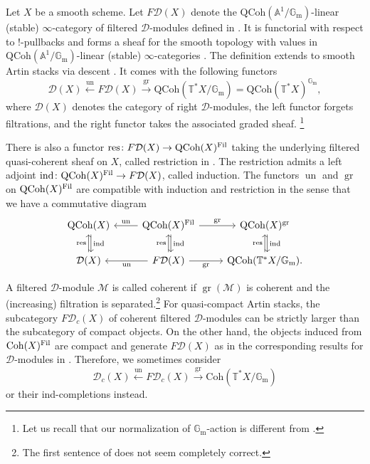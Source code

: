 \documentclass{amsart}
\theoremstyle{definition}
\theoremstyle{remark}
\numberwithin{equation}{section}
\DeclareMathOperator{\ind}{\mathrm{ind}}
\newcommand{\mc}{\mathcal}
\newcommand{\bb}{\mathbb}
\newcommand{\Gm}{{\mathbb{G}_{\mathrm{m}}}}
\newcommand{\res}{\mathrm{res}}
\newcommand{\QCoh}{\mathrm{QCoh}}
\newcommand{\Coh}{\mathrm{Coh}}
\newcommand{\T}{\mathbb{T}}
\DeclareMathOperator{\un}{\mathrm{un}}
\DeclareMathOperator{\gr}{gr}
\begin{document}
Let $X$ be a smooth scheme. Let $F\mc D (X)$ denote the $\QCoh(\bb A^1/\Gm)$-linear (stable) $\infty$-category of filtered $\mc D$-modules defined in \cite[Definition 3.3.1]{Chen2023categorical}. It is functorial with respect to $!$-pullbacks \cite[Proposition 3.3.10]{Chen2023categorical} and forms a sheaf for the smooth topology with values in $\QCoh(\bb A^1/\Gm)$-linear (stable) $\infty$-categories \cite[Proposition 3.3.18]{Chen2023categorical}. The definition extends to smooth Artin stacks via descent \cite[Definition 3.3.20]{Chen2023categorical}. It comes with the following functors
\[
\mc D(X) \xleftarrow{\un} F\mc{D} (X) \xrightarrow{\gr} \QCoh(\bb T^* X/\Gm)=\QCoh(\T^*X)^\Gm, 
\]
where $\mc D(X)$ denotes the category of right $\mc D$-modules, the left functor forgets filtrations, and the right functor takes the associated graded sheaf.
\footnote{Let us recall that our normalization of $\Gm$-action is different from \cite{Chen2023categorical}.}

There is also a functor $\res\colon F\mc D (X) \to \QCoh(X)^{\textnormal{Fil}}$ taking the underlying filtered quasi-coherent sheaf on $X$, called restriction in \cite{Chen2023categorical}. The restriction admits a left adjoint $\ind\colon \QCoh(X)^{\textnormal{Fil}} \to F\mc{D}(X)$, called induction. The functors $\un$ and $\gr$ on $\QCoh(X)^{\textnormal{Fil}}$ are compatible with induction and restriction in the sense that we have a commutative diagram 
\begin{equation*}
    \begin{tikzcd}
       \QCoh(X) \arrow[d, "\ind", shift left]   & \QCoh(X)^{\textnormal{Fil}} \arrow[d, "\ind", shift left] \arrow[r, "\gr"] \arrow[l, "\un", swap] & \QCoh(X)^{\gr} \arrow[d, "\ind", shift left]  \\
        \mc{D}(X) \arrow[u, "\res"] & F\mc{D}(X) \arrow[u, "\res"] \arrow[r, "\gr", swap] \arrow[l, "\un"] & \QCoh(\T^{\ast}X / \Gm) \arrow[u, "\res"].
    \end{tikzcd}
\end{equation*}





A filtered $\mc D$-module $\mc M$ is called coherent if $\gr (\mc M)$ is coherent and the (increasing) filtration is separated.\footnote{The first sentence of \cite[Remark 3.3.4]{Chen2023categorical} does not seem completely correct.} For quasi-compact Artin stacks, the subcategory $F\mc D_c(X)$ of coherent filtered $\mc D$-modules can be strictly larger than the subcategory of compact objects. On the other hand, the objects induced from $\Coh(X)^{\textnormal{Fil}}$ are compact and generate $F\mc D (X)$ as in the corresponding results for $\mc D$-modules in \cite{DrinfeldGaitsgory}. Therefore, we sometimes consider
\[
\mc D_c(X) \xleftarrow{\un} F\mc{D}_c (X) \xrightarrow{\gr} \Coh(\bb T^* X/\Gm) 
\]
or their ind-completions instead. 
\end{document}
